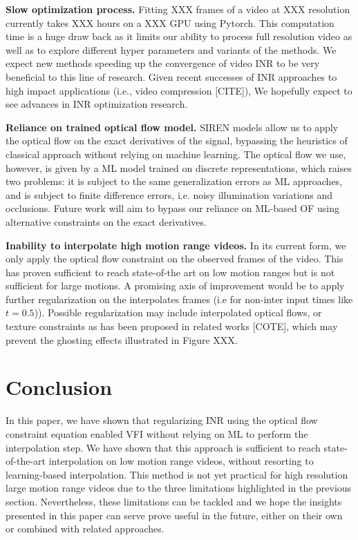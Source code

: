 \documentclass{article}
\begin{document}
\textbf{Slow optimization process.} Fitting XXX frames of a video at XXX resolution currently takes XXX hours on a XXX GPU using Pytorch.
This computation time is a huge draw back as it limits our ability to process full resolution video as well as
to explore different hyper parameters and variants of the methods.
We expect new methods speeding up the convergence of video INR to be very beneficial to this line of research.
Given recent successes of INR approaches to high impact applications (i.e., video compression [CITE]),
We hopefully expect to see advances in INR optimization research.

\textbf{Reliance on trained optical flow model.}
SIREN models allow us to apply the optical flow on the exact derivatives of the signal,
bypassing the heuristics of classical approach without relying on machine learning.
The optical flow we use, however, is given by a ML model trained on discrete representations, which raises two problems:
it is subject to the same generalization errors as ML approaches,
and is subject to finite difference errors, i.e. noisy illumination variations and occlusions.
Future work will aim to bypass our reliance on ML-based OF using alternative constraints on the exact derivatives.

\textbf{Inability to interpolate high motion range videos.}
In its current form, we only apply the optical flow constraint on the observed frames of the video.
This has proven sufficient to reach state-of-the art on low motion ranges but is not sufficient for large motions.
A promising axis of improvement would be to apply further regularization on the interpolates frames (i.e for non-inter input times like $t=0.5$)).
Possible regularization may include interpolated optical flows, or texture constraints as has been proposed in related works [COTE],
which may prevent the ghosting effects illustrated in Figure XXX.

\section{Conclusion}

In this paper, we have shown that regularizing INR using the optical flow constraint equation
enabled VFI without relying on ML to perform the interpolation step.
We have shown that this approach is sufficient to reach state-of-the-art interpolation on low motion range videos,
without resorting to learning-based interpolation.
This method is not yet practical for high resolution large motion range videos due to the three limitations highlighted in the
previous section.
Nevertheless, these limitations can be tackled and we hope the insights presented in this paper can serve prove useful in the future,
either on their own or combined with related approaches.
\end{document}
